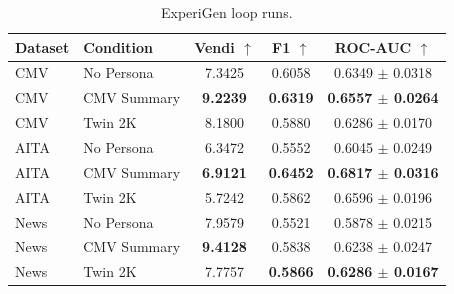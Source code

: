 \fi %


\newcommand{\cmvRedTwo}{CMV Summary: Demographics + Education and Work}
\newcommand{\cmvRedThree}{CMV Summary: Demographics + Education and Work + Cultural and Community Context}
\newcommand{\cmvRedFour}{CMV Summary: Demographics + Education and Work + Cultural and Community Context + Politics and Ideology}
\newcommand{\cmvRedFive}{CMV Summary: Demographics + Education and Work + Cultural and Community Context + Politics and Ideology + Values and Priorities}
\newcommand{\cmvRedSix}{CMV Summary: Demographics + Education and Work + Cultural and Community Context + Politics and Ideology + Values and Priorities + Argumentation Style}
\newcommand{\twinRedTwo}{Twin 2K Summary: Demographics + Social and Economic Background}
\newcommand{\twinRedThree}{Twin 2K Summary: Demographics + Social and Economic Background + Personality and Psychological Traits}
\newcommand{\twinRedFour}{Twin 2K Summary: Demographics + Social and Economic Background + Personality and Psychological Traits + Cognitive Ability}
\newcommand{\twinRedFive}{Twin 2K Summary: Demographics + Social and Economic Background + Personality and Psychological Traits + Cognitive Ability + Economic Preferences}

\begin{table}[H]
\centering
\caption{ExperiGen loop runs.}
\label{tab:vendi-cmv-aita-15personas-innerloop}
\small
\begin{tabular}{llccc}
\toprule
\textbf{Dataset} & \textbf{Condition} & \textbf{Vendi} $\uparrow$ & \textbf{F1} $\uparrow$ & \textbf{ROC-AUC} $\uparrow$ \\
\midrule
CMV & No Persona & 7.3425 & 0.6058 & 0.6349 $\pm$ 0.0318 \\
CMV & CMV Summary & \textbf{9.2239} & \textbf{0.6319} & \textbf{0.6557 $\pm$ 0.0264} \\
CMV & Twin 2K & 8.1800 & 0.5880 & 0.6286 $\pm$ 0.0170 \\
\midrule
AITA & No Persona & 6.3472 & 0.5552 & 0.6045 $\pm$ 0.0249 \\
AITA & CMV Summary & \textbf{6.9121} & \textbf{0.6452} & \textbf{0.6817 $\pm$ 0.0316} \\
AITA & Twin 2K & 5.7242 & 0.5862 & 0.6596 $\pm$ 0.0196 \\
\midrule
News & No Persona & 7.9579 & 0.5521 & 0.5878 $\pm$ 0.0215 \\
News & CMV Summary & \textbf{9.4128} & 0.5838 & 0.6238 $\pm$ 0.0247 \\
News & Twin 2K & 7.7757 & \textbf{0.5866} & \textbf{0.6286 $\pm$ 0.0167} \\
\bottomrule
\end{tabular}
\end{table}


